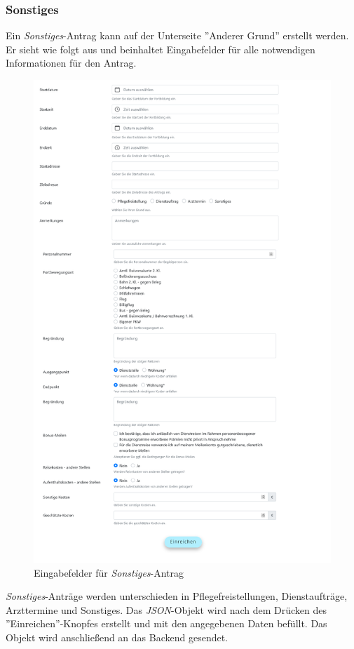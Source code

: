 \subsubsection{Sonstiges}
Ein \textit{Sonstiges}-Antrag kann auf der Unterseite ''Anderer Grund'' erstellt werden. Er sieht wie folgt aus und beinhaltet Eingabefelder für alle notwendigen Informationen für den Antrag.
\begin{figure}[H]
	\centering
	\includegraphics[width=0.9\linewidth]{images/othercause}
	\caption[Sonstiges Antrag]{Eingabefelder für \textit{Sonstiges}-Antrag}
	\label{fig:othercause}
\end{figure}
\textit{Sonstiges}-Anträge werden unterschieden in Pflegefreistellungen, Dienstaufträge, Arzttermine und Sonstiges. Das \textit{JSON}-Objekt wird nach dem Drücken des ''Einreichen''-Knopfes erstellt und mit den angegebenen Daten befüllt. Das Objekt wird anschließend an das Backend gesendet.\\

